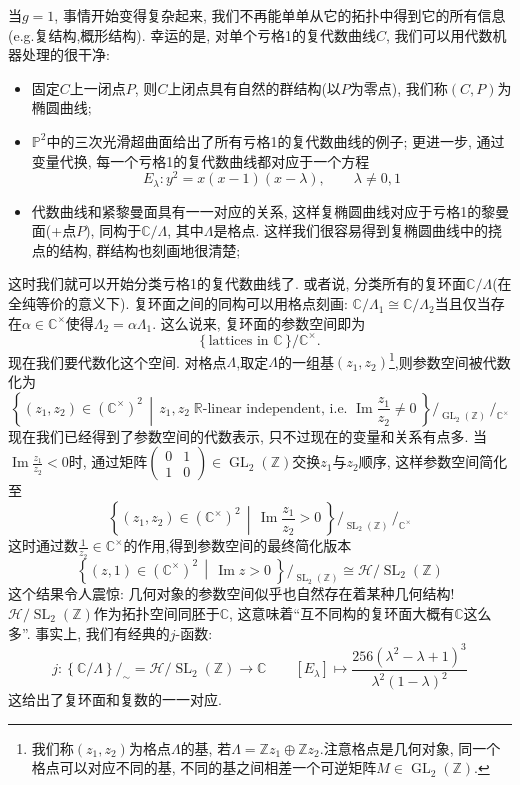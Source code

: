 \documentclass[UTF8,12pt,twoside]{article}
\theoremstyle{definition}
\newcommand{\RR}{\mathbb{R}}  %
\newcommand{\ZZ}{\mathbb{Z}}  %
\newcommand{\CC}{\mathbb{C}}  %
\newcommand{\CCt}{\mathbb{C}^{\times}}  %
\newcommand{\Img}{\operatorname{Im}}
\newcommand{\GL}{\operatorname{GL}}
\newcommand{\SL}{\operatorname{SL}}
\numberwithin{equation}{section}
\begin{document}
当$g=1$, 事情开始变得复杂起来, 我们不再能单单从它的拓扑中得到它的所有信息(e.g.复结构,概形结构). 幸运的是, 对单个亏格1的复代数曲线$C$, 我们可以用代数机器处理的很干净: 
\begin{itemize}
	\item 固定$C$上一闭点$P$, 则$C$上闭点具有自然的群结构(以$P$为零点), 我们称$(C,P)$为椭圆曲线;      
	\item $\mathbb{P}^2$中的三次光滑超曲面给出了所有亏格1的复代数曲线的例子;      更进一步, 通过变量代换, 每一个亏格1的复代数曲线都对应于一个方程
	$$E_{\lambda}: y^2=x(x-1)(x-\lambda), \qquad \lambda \neq 0,1$$
	
	\item 代数曲线和紧黎曼面具有一一对应的关系, 这样复椭圆曲线对应于亏格1的黎曼面(+点$P$), 同构于$\CC/\Lambda$, 其中$\Lambda$是格点. 这样我们很容易得到复椭圆曲线中的挠点的结构, 群结构也刻画地很清楚;
\end{itemize}

这时我们就可以开始分类亏格1的复代数曲线了. 或者说, 分类所有的复环面$\CC/\Lambda$(在全纯等价的意义下). 复环面之间的同构可以用格点刻画:  $\CC/\Lambda_1 \cong \CC/\Lambda_2$当且仅当存在$\alpha \in \CCt$使得$\Lambda_2=\alpha \Lambda_1$. 这么说来, 复环面的参数空间即为
$$\big\{\,\text{lattices in }  \CC   \,\big\}/\CCt. $$
现在我们要代数化这个空间. 对格点$\Lambda$,取定$\Lambda$的一组基$(z_1,z_2)$\footnote{我们称$(z_1,z_2)$为格点$\Lambda$的基, 若$\Lambda=\ZZ z_1 \oplus \ZZ z_2$.注意格点是几何对象, 同一个格点可以对应不同的基, 不同的基之间相差一个可逆矩阵$M \in \GL_2(\ZZ)$.},则参数空间被代数化为
$$\left\{(z_1,z_2) \in (\CCt)^2\,  \middle|\,z_1,z_2 \;\RR\text{-linear independent, i.e. }\Img \frac{z_1}{z_2} \neq 0 \   \right\} \Big/_{\displaystyle\GL_2(\ZZ)}\,\Big/_{\displaystyle\CCt}$$
现在我们已经得到了参数空间的代数表示, 只不过现在的变量和关系有点多. 当$\Img \frac{z_1}{z_2}<0$时, 通过矩阵$\left(\begin{smallmatrix}
0&1\\ 1 & 0
\end{smallmatrix}\right) \in \GL_2(\ZZ)$交换$z_1$与$z_2$顺序, 这样参数空间简化至
$$\left\{(z_1,z_2) \in (\CCt)^2\,  \middle|\,\Img \frac{z_1}{z_2} > 0 \   \right\} \Big/_{\displaystyle\SL_2(\ZZ)}\,\Big/_{\displaystyle\CCt}$$
这时通过数$\frac{1}{z_2}\in \CCt$的作用,得到参数空间的最终简化版本
$$\left\{(z,1) \in (\CCt)^2\,  \middle|\,\Img z > 0 \   \right\} \Big/_{\displaystyle\SL_2(\ZZ)} \cong \mathcal{H}/{\SL_2(\ZZ)}$$
这个结果令人震惊: 几何对象的参数空间似乎也自然存在着某种几何结构! $\mathcal{H}/\SL_2(\ZZ)$作为拓扑空间同胚于$\CC$, 这意味着“互不同构的复环面大概有$\CC$这么多”. 事实上, 我们有经典的$j$-函数: 
$$j:\left\{ \CC/\Lambda \right\}\!/_{\displaystyle \sim} = \mathcal{H}/{\SL_2(\ZZ)} \longrightarrow \CC \qquad [E_\lambda] \longmapsto \frac{256(\lambda^2-\lambda+1)^3}{\lambda^2(1-\lambda)^2}$$
这给出了复环面和复数的一一对应.
\end{document}
